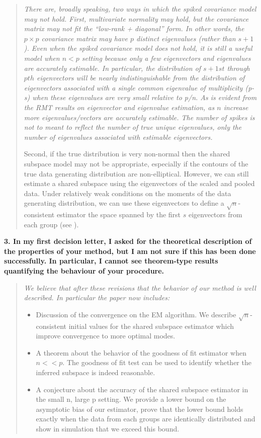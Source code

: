 \documentclass{article}
\newenvironment{resp}{\begin{quotation}\noindent\slshape}{\end{quotation}}
\begin{document}
\begin{resp}
There are, broadly speaking, two ways in which the spiked covariance model may not hold.  First, multivariate normality may hold, but the covariance matrix may not fit the ``low-rank + diagonal'' form. In other words, the $p \times p$ covariance matrix may have $p$ distinct eigenvalues (rather than $s + 1$).  Even when the spiked covariance model does not hold, it is still a \emph{useful} model when $n < p$ setting because only a few eigenvectors and eigenvalues are accurately estimable.  In particular, the distribution of $s+1st$ through $pth$ eigenvectors will be nearly indistinguishable from the distribution of eigenvectors associated with a single common eigenvalue of multiplicity (p-s) when these eigenvalues are very small relative to p/n.  As is evident from the RMT results on eigenvector and eigenvalue estimation, as $n$ increase more eigenvalues/vectors are accurately estimable.  The number of spikes is not to meant to reflect the number of \emph{true} unique eigenvalues, only the number of eigenvalues associated with estimable eigenvectors.

Second, if the true distribution is very non-normal then the shared subspace model may not be appropriate, especially if the contours of the true data generating distribution are non-elliptical.  However, we can still estimate a shared subspace using the eigenvectors of the scaled and pooled data.  Under relatively weak conditions on the moments of the data generating distribution, we can use these eigenvectors to define a  $\sqrt{n}$-consistent estimator the space spanned by the first $s$ eigenvectors from each group (see \citep{Mestre2008}).  
\end{resp}

\textbf{3. In my first decision letter, I asked for the theoretical description of the properties of your method, but I am not sure if this has been done successfully. In particular, I cannot see theorem-type results quantifying the behaviour of your procedure.}

\begin{resp}
We believe that after these revisions that the behavior of our method is well described.  In particular the paper now includes:
\begin{itemize}
\item Discussion of the convergence on the EM algorithm.  We describe $\sqrt{n}$-consistent initial values for the shared subspace estimator which improve convergence to more optimal modes.
\item A theorem about the behavior of the goodness of fit estimator when $n << p$.  The goodness of fit test can be used to identify whether the inferred subspace is indeed reasonable.  
\item A conjecture about the accuracy of the shared subspace estimator in the small n, large p setting.  We provide a lower bound on the asymptotic bias of our estimator, prove that the lower bound holds exactly when the data from each groups are identically distributed and show in simulation that we exceed this bound.  
\end{itemize}
\end{resp}



\end{document}
